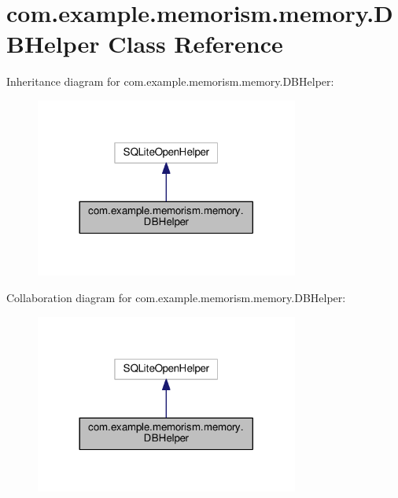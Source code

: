 \hypertarget{classcom_1_1example_1_1memorism_1_1memory_1_1_d_b_helper}{}\section{com.\+example.\+memorism.\+memory.\+D\+B\+Helper Class Reference}
\label{classcom_1_1example_1_1memorism_1_1memory_1_1_d_b_helper}


Inheritance diagram for com.\+example.\+memorism.\+memory.\+D\+B\+Helper\+:
\nopagebreak
\begin{figure}[H]
\begin{center}
\leavevmode
\includegraphics[width=245pt]{d2/d8c/classcom_1_1example_1_1memorism_1_1memory_1_1_d_b_helper__inherit__graph}
\end{center}
\end{figure}


Collaboration diagram for com.\+example.\+memorism.\+memory.\+D\+B\+Helper\+:
\nopagebreak
\begin{figure}[H]
\begin{center}
\leavevmode
\includegraphics[width=245pt]{d5/d96/classcom_1_1example_1_1memorism_1_1memory_1_1_d_b_helper__coll__graph}
\end{center}
\end{figure}
